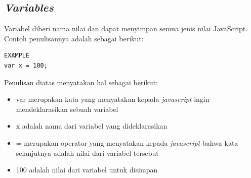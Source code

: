 \subsection{\textit{Variables}}
\label{sec: Variables}
   Variabel diberi nama nilai dan dapat menyimpan semua jenis nilai JavaScript\cite{javascriptlearn}. Contoh penulisannya adalah sebagai berikut: 
    \begin{lstlisting}[basicstyle=\ttfamily, frame=single,
    columns=fullflexible, breaklines=true, numbers=none]
EXAMPLE
var x = 100;
    \end{lstlisting}
    Penulisan diatas menyatakan hal sebagai berikut:
    \begin{itemize}
        \item var merupakan kata yang menyatakan kepada \textit{javascript} ingin mendeklarasikan sebuah variabel
        \item x adalah nama dari variabel yang dideklarasikan
        \item = merupakan operator yang menyatakan kepada \textit{javascript} bahwa kata selanjutnya adalah nilai dari variabel tersebut
        \item 100 adalah nilai dari variabel untuk disimpan
    \end{itemize}
